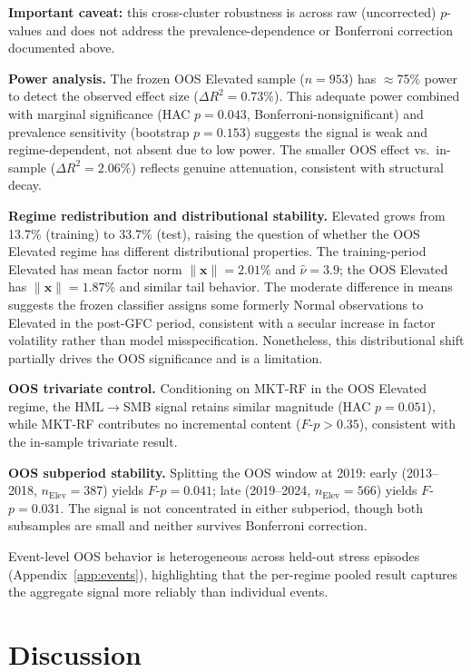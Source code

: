 \documentclass[sigconf,anonymous]{acmart}
\begin{document}
\textbf{Important caveat:} this cross-cluster robustness is across raw
(uncorrected) $p$-values and does not address the prevalence-dependence
or Bonferroni correction documented above.

\textbf{Power analysis.} The frozen OOS Elevated sample ($n = 953$) has
$\approx$75\% power to detect the observed effect size
($\Delta R^2 = 0.73\%$). This adequate power combined with marginal
significance (HAC $p = 0.043$, Bonferroni-nonsignificant) and
prevalence sensitivity (bootstrap $p = 0.153$) suggests the signal is
weak and regime-dependent, not absent due to low power.
The smaller OOS effect vs.\ in-sample ($\Delta R^2 = 2.06\%$) reflects
genuine attenuation, consistent with structural decay.

\textbf{Regime redistribution and distributional stability.}
Elevated grows from 13.7\% (training) to 33.7\% (test), raising the question
of whether the OOS Elevated regime has different distributional properties.
The training-period Elevated has mean factor norm $\|\mathbf{x}\| = 2.01$\% and
$\hat{\nu} = 3.9$; the OOS Elevated has $\|\mathbf{x}\| = 1.87$\% and similar
tail behavior. The moderate difference in means suggests the frozen classifier
assigns some formerly Normal observations to Elevated in the post-GFC period,
consistent with a secular increase in factor volatility rather than model
misspecification. Nonetheless, this distributional shift partially drives the OOS
significance and is a limitation.

\textbf{OOS trivariate control.}
Conditioning on MKT-RF in the OOS Elevated regime, the HML$\to$SMB signal retains
similar magnitude (HAC $p = 0.051$), while MKT-RF contributes no incremental content
($F$-$p > 0.35$), consistent with the in-sample trivariate result.

\textbf{OOS subperiod stability.}
Splitting the OOS window at 2019: early (2013--2018, $n_{\text{Elev}} = 387$)
yields $F$-$p = 0.041$; late (2019--2024, $n_{\text{Elev}} = 566$) yields
$F$-$p = 0.031$. The signal is not concentrated in either subperiod,
though both subsamples are small and neither survives Bonferroni correction.

Event-level OOS behavior is heterogeneous across held-out stress episodes
(Appendix~\ref{app:events}), highlighting that the per-regime pooled result
captures the aggregate signal more reliably than individual events.

\section{Discussion}
\end{document}
